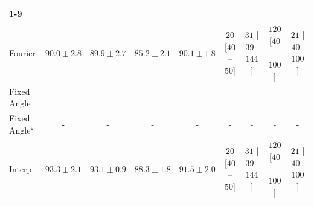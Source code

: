 \begin{tabular}{l|cccc|cccc|}
\cline{1-9}
\multicolumn{9}{c}{\rule{0pt}{8pt}PP} \\
\midrule
Fourier & {\cellcolor[HTML]{42AB5D}} \color[HTML]{F1F1F1} $90.0\pm 2.8$ & {\cellcolor[HTML]{43AC5E}} \color[HTML]{F1F1F1} $89.9\pm 2.7$ & {\cellcolor[HTML]{ABDC8D}} \color[HTML]{000000} $85.2\pm 2.1$ & {\cellcolor[HTML]{40AA5C}} \color[HTML]{F1F1F1} $90.1\pm 1.8$ & {\cellcolor[HTML]{FFF5F1}} \color[HTML]{000000} $20$ [$40$--$50$] & {\cellcolor[HTML]{FFF2EE}} \color[HTML]{000000} $31$ [$39$--$144$] & {\cellcolor[HTML]{FDD8D5}} \color[HTML]{000000} $120$ [$40$--$100$] & {\cellcolor[HTML]{FFF4F0}} \color[HTML]{000000} $21$ [$40$--$100$] \\
Fixed Angle & {\cellcolor[HTML]{000000}} \color[HTML]{F1F1F1} {\cellcolor{white}} \color{black} - & {\cellcolor[HTML]{000000}} \color[HTML]{F1F1F1} {\cellcolor{white}} \color{black} - & {\cellcolor[HTML]{000000}} \color[HTML]{F1F1F1} {\cellcolor{white}} \color{black} - & {\cellcolor[HTML]{000000}} \color[HTML]{F1F1F1} {\cellcolor{white}} \color{black} - & {\cellcolor[HTML]{000000}} \color[HTML]{F1F1F1} {\cellcolor{white}} \color{black} - & {\cellcolor[HTML]{000000}} \color[HTML]{F1F1F1} {\cellcolor{white}} \color{black} - & {\cellcolor[HTML]{000000}} \color[HTML]{F1F1F1} {\cellcolor{white}} \color{black} - & {\cellcolor[HTML]{000000}} \color[HTML]{F1F1F1} {\cellcolor{white}} \color{black} - \\
Fixed Angle$^\star$ & {\cellcolor[HTML]{000000}} \color[HTML]{F1F1F1} {\cellcolor{white}} \color{black} - & {\cellcolor[HTML]{000000}} \color[HTML]{F1F1F1} {\cellcolor{white}} \color{black} - & {\cellcolor[HTML]{000000}} \color[HTML]{F1F1F1} {\cellcolor{white}} \color{black} - & {\cellcolor[HTML]{000000}} \color[HTML]{F1F1F1} {\cellcolor{white}} \color{black} - & {\cellcolor[HTML]{000000}} \color[HTML]{F1F1F1} {\cellcolor{white}} \color{black} - & {\cellcolor[HTML]{000000}} \color[HTML]{F1F1F1} {\cellcolor{white}} \color{black} - & {\cellcolor[HTML]{000000}} \color[HTML]{F1F1F1} {\cellcolor{white}} \color{black} - & {\cellcolor[HTML]{000000}} \color[HTML]{F1F1F1} {\cellcolor{white}} \color{black} - \\
Interp & {\cellcolor[HTML]{187B3F}} \color[HTML]{F1F1F1} $93.3\pm 2.1$ & {\cellcolor[HTML]{1A7D40}} \color[HTML]{F1F1F1} $93.1\pm 0.9$ & {\cellcolor[HTML]{68BE71}} \color[HTML]{000000} $88.3\pm 1.8$ & {\cellcolor[HTML]{2F944E}} \color[HTML]{F1F1F1} $91.5\pm 2.0$ & {\cellcolor[HTML]{FFF5F1}} \color[HTML]{000000} $20$ [$40$--$50$] & {\cellcolor[HTML]{FFF2EE}} \color[HTML]{000000} $31$ [$39$--$144$] & {\cellcolor[HTML]{FDD8D5}} \color[HTML]{000000} $120$ [$40$--$100$] & {\cellcolor[HTML]{FFF4F0}} \color[HTML]{000000} $21$ [$40$--$100$] \\

\end{tabular}
